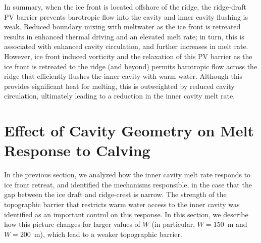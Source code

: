 \documentclass[draft]{agujournal2019}
\begin{document}
In summary, when the ice front is located offshore of the ridge, the ridge-draft PV barrier prevents barotropic flow into the cavity and inner cavity flushing is weak. Reduced boundary mixing with meltwater as the ice front is retreated results in enhanced thermal driving and an elevated melt rate; in turn, this is associated with enhanced cavity circulation, and further increases in melt rate. However, ice front induced vorticity and the relaxation of this PV barrier as the ice front is retreated to the ridge (and beyond) permits barotropic flow across the ridge that efficiently flushes the inner cavity with warm water. Although this provides significant heat for melting, this is outweighted by reduced cavity circulation,  ultimately leading to a reduction in the inner cavity melt rate.

\section{Effect of Cavity Geometry on Melt Response to Calving}\label{S:Results:H}
In the previous section, we analyzed how the inner cavity melt rate responds to ice front retreat, and identified the mechanisms responsible, in the case that the gap between the ice draft and ridge-crest is narrow. The strength of the topographic barrier that restricts warm water access to the inner cavity was identified as an important control on this response. In this section, we describe how this picture changes for larger values of $W$ (in particular, $W=150$~m and $W=200$~m), which lead to a weaker topographic barrier.

\end{document}
